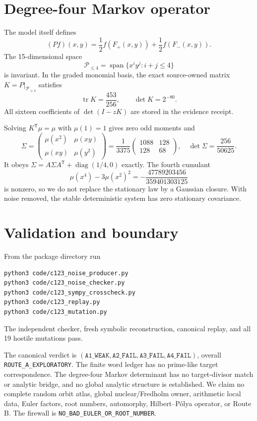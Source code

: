 \documentclass[10pt]{article}
\begin{document}
\section{Degree-four Markov operator}
The model itself defines
\[
 (Pf)(x,y)=\frac12 f(F_+(x,y))+\frac12 f(F_-(x,y)).
\]
The 15-dimensional space
\[
 \mathcal P_{\le4}=\operatorname{span}\{x^iy^j:i+j\le4\}
\]
is invariant.  In the graded monomial basis, the exact source-owned matrix
$K=P|_{\mathcal P_{\le4}}$ satisfies
\[
 \operatorname{tr}K=\frac{453}{256},\qquad \det K=2^{-80}.
\]
All sixteen coefficients of $\det(I-zK)$ are stored in the evidence receipt.

Solving $K^{\mathsf T}\mu=\mu$ with $\mu(1)=1$ gives zero odd moments and
\[
 \Sigma=\begin{pmatrix}\mu(x^2)&\mu(xy)\\\mu(xy)&\mu(y^2)\end{pmatrix}
 =\frac1{3375}\begin{pmatrix}1088&128\\128&68\end{pmatrix},
 \quad \det\Sigma=\frac{256}{50625}.
\]
It obeys $\Sigma=A\Sigma A^{\mathsf T}+\operatorname{diag}(1/4,0)$ exactly.
The fourth cumulant
\[
 \mu(x^4)-3\mu(x^2)^2
 =-\frac{47789203456}{359401303125}
\]
is nonzero, so we do not replace the stationary law by a Gaussian closure.
With noise removed, the stable deterministic system has zero stationary
covariance.

\section{Validation and boundary}
From the package directory run
\begin{verbatim}
python3 code/c123_noise_producer.py
python3 code/c123_noise_checker.py
python3 code/c123_sympy_crosscheck.py
python3 code/c123_replay.py
python3 code/c123_mutation.py
\end{verbatim}
The independent checker, fresh symbolic reconstruction, canonical replay, and
all 19 hostile mutations pass.

The canonical verdict is
$(\texttt{A1\_WEAK},\texttt{A2\_FAIL},\texttt{A3\_FAIL},
\texttt{A4\_FAIL})$, overall \texttt{ROUTE\_A\_EXPLORATORY}.
The finite word ledger has no prime-like target correspondence.  The
degree-four Markov determinant has no target-divisor match or analytic bridge,
and no global analytic structure is established.  We claim no complete random
orbit atlas, global nuclear/Fredholm owner, arithmetic local data, Euler
factors, root numbers, automorphy, Hilbert--P\'olya operator, or Route B.  The firewall is
\texttt{NO\_BAD\_EULER\_OR\_ROOT\_NUMBER}.
\end{document}
